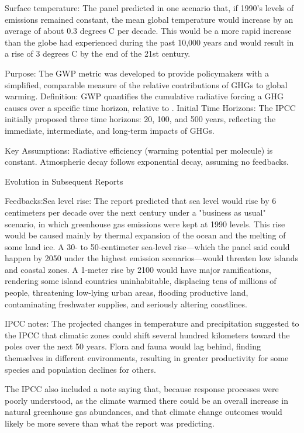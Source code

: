 \documentclass{tufte-handout}\usepackage[]{graphicx}\usepackage[]{xcolor}
\begin{document}
Surface temperature: The panel predicted in one scenario that, if 1990's levels of emissions remained constant, the mean global temperature would increase by an average of about 0.3 degrees C per decade. This would be a more rapid increase than the globe had experienced during the past 10,000 years and would result in a rise of 3 degrees C by the end of the 21st century.

Purpose: The GWP metric was developed to provide policymakers with a simplified, comparable measure of the relative contributions of GHGs to global warming.
Definition: GWP quantifies the cumulative radiative forcing a GHG causes over a specific time horizon, relative to .
Initial Time Horizons: The IPCC initially proposed three time horizons: 20, 100, and 500 years, reflecting the immediate, intermediate, and long-term impacts of GHGs.

Key Assumptions:
Radiative efficiency (warming potential per molecule) is constant.
Atmospheric decay follows exponential decay, assuming no feedbacks.


Evolution in Subsequent Reports

Feedbacks:Sea level rise: The report predicted that sea level would rise by 6 centimeters per decade over the next century under a "business as usual" scenario, in which greenhouse gas emissions were kept at 1990 levels. This rise would be caused mainly by thermal expansion of the ocean and the melting of some land ice. A 30- to 50-centimeter sea-level rise—which the panel said could happen by 2050 under the highest emission scenarios—would threaten low islands and coastal zones. A 1-meter rise by 2100 would have major ramifications, rendering some island countries uninhabitable, displacing tens of millions of people, threatening low-lying urban areas, flooding productive land, contaminating freshwater supplies, and seriously altering coastlines.

IPCC notes: The projected changes in temperature and precipitation suggested to the IPCC that climatic zones could shift several hundred kilometers toward the poles over the next 50 years. Flora and fauna would lag behind, finding themselves in different environments, resulting in greater productivity for some species and population declines for others.

The IPCC also included a note saying that, because response processes were poorly understood, as the climate warmed there could be an overall increase in natural greenhouse gas abundances, and that climate change outcomes would likely be more severe than what the report was predicting.
\end{document}
